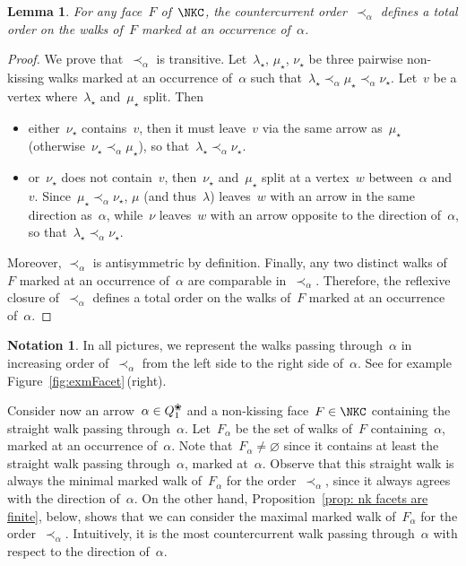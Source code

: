 \documentclass{amsart}
\newtheorem{lemma}[theorem]{Lemma}
\theoremstyle{definition}
\newtheorem{notation}[theorem]{Notation}
\newcommand{\fref}[1]{Figure~\ref{#1}} %
\newcommand{\blossom}{^\text{\ding{96}}} %
\begin{document}

\begin{lemma}
For any face~$F$ of~$\NKC$, the countercurrent order~$\prec_\alpha$ defines a total order on the walks of~$F$ marked at an occurrence of~$\alpha$.
\end{lemma}

\begin{proof}
We prove that~$\prec_\alpha$ is transitive.
Let~$\lambda_\star$, $\mu_\star$, $\nu_\star$ be three pairwise non-kissing walks marked at an occurrence of~$\alpha$ such that~${\lambda_\star \prec_\alpha \mu_\star \prec_\alpha \nu_\star}$. Let~$v$ be a vertex where~$\lambda_\star$ and~$\mu_\star$ split. Then
\begin{itemize}
\item either~$\nu_\star$ contains~$v$, then it must leave~$v$ via the same arrow as~$\mu_\star$ (otherwise~$\nu_\star \prec_\alpha \mu_\star$), so that~$\lambda_\star \prec_\alpha \nu_\star$.
\item or~$\nu_\star$ does not contain~$v$, then~$\nu_\star$ and~$\mu_\star$ split at a vertex~$w$ between~$\alpha$ and~$v$. Since~${\mu_\star \prec_\alpha \nu_\star}$, $\mu$ (and thus~$\lambda$) leaves~$w$ with an arrow in the same direction as~$\alpha$, while~$\nu$ leaves~$w$ with an arrow opposite to the direction of~$\alpha$, so that~$\lambda_\star \prec_\alpha \nu_\star$.
\end{itemize}
Moreover, $\prec_\alpha$ is antisymmetric by definition.
Finally, any two distinct walks of~$F$ marked at an occurrence of~$\alpha$ are comparable in~$\prec_\alpha$.
Therefore, the reflexive closure of~$\prec_\alpha$ defines a total order on the walks of~$F$ marked at an occurrence of~$\alpha$.
\end{proof}

\begin{notation}
In all pictures, we represent the walks passing through~$\alpha$ in increasing order of~$\prec_\alpha$ from the left side to the right side of~$\alpha$. See for example \fref{fig:exmFacet}\,(right).
\end{notation}

Consider now an arrow~$\alpha \in Q\blossom_1$ and a non-kissing face~$F \in \NKC$ containing the straight walk passing through~$\alpha$.
Let~$F_\alpha$ be the set of walks of~$F$ containing~$\alpha$, marked at an occurrence of~$\alpha$.
Note that~$F_\alpha \ne \varnothing$ since it contains at least the straight walk passing through~$\alpha$, marked at~$\alpha$.
Observe that this straight walk is always the minimal marked walk of~$F_\alpha$ for the order~$\prec_\alpha$, since it always agrees with the direction of~$\alpha$.
On the other hand, Proposition~\ref{prop: nk facets are finite}, below, shows that we can consider the maximal marked walk of~$F_\alpha$ for the order~$\prec_\alpha$.
Intuitively, it is the most countercurrent walk passing through~$\alpha$ with respect to the direction of~$\alpha$.
\end{document}

